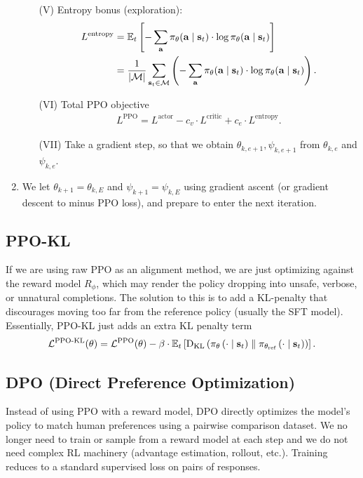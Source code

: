 \documentclass[11pt]{article}  %
\begin{document}
\begin{enumerate}
\begin{enumerate}
    \item[(V)] Entropy bonus (exploration):
    \begin{align*}
      L^{\text{entropy}} &= \mathbb{E}_{t}\left[-\sum_{\mathbf{a}}\pi_\theta(\mathbf{a}\mid\mathbf{s}_t)\cdot\log\pi_\theta(\mathbf{a}\mid\mathbf{s}_t)\right] \\
      &= \frac{1}{\lvert\mathcal{M}\rvert} \sum_{\mathbf{s}_t \in \mathcal{M}}\left( -\sum_{\mathbf{a}}\pi_\theta(\mathbf{a}\mid\mathbf{s}_t)\cdot\log\pi_\theta(\mathbf{a}\mid\mathbf{s}_t) \right).
    \end{align*}

    \item[(VI)] Total PPO objective 
    \begin{align*}
      L^{\text{PPO}} = L^{\text{actor}} - c_v \cdot L^{\text{critic}} + c_e \cdot L^{\text{entropy}}.
    \end{align*}

    \item[(VII)] Take a gradient step, so that we obtain $\theta_{k, e + 1}, \psi_{k, e+1}$ from $\theta_{k, e}$ and $\psi_{k, e}$. 
  \end{enumerate}

  \item We let $\theta_{k+1} = \theta_{k, E}$ and $\psi_{k+1} = \psi_{k, E}$ using gradient ascent (or gradient descent to minus PPO loss), and prepare to enter the next iteration.
\end{enumerate}




\subsection{PPO-KL}
If we are using raw PPO as an alignment method, we are just optimizing against the reward model $R_{\phi}$, which may render the policy dropping into unsafe, verbose, or unnatural completions.
The solution to this is to add a KL-penalty that discourages moving too far from the reference policy (usually the SFT model).
Essentially, PPO-KL just adds an extra KL penalty term 
\begin{align*}
  \mathcal{L}^{\text{PPO-KL}}(\theta) = \mathcal{L}^{\text{PPO}}(\theta) - \beta\cdot\mathbb{E}_{t}\left[{\rm D}_{\text{KL}}\left( \pi_{\theta}\left( \cdot \mid \mathbf{s}_t \right) \parallel \pi_{\theta_{\text{ref}}}\left( \cdot \mid \mathbf{s}_t \right) \right)\right].
\end{align*}


\subsection{DPO (Direct Preference Optimization)}
Instead of using PPO with a reward model, DPO directly optimizes the model's policy to match human preferences using a pairwise comparison dataset.
We no longer need to train or sample from a reward model at each step and we do not need complex RL machinery (advantage estimation, rollout, etc.).
Training reduces to a standard supervised loss on pairs of responses.
\end{document}
